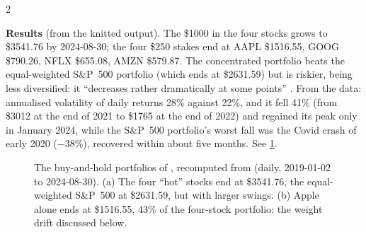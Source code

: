 \begin{paracol}{2}
\begin{casestudy}
\textbf{Results} (from the knitted output). The \$1000 in the four stocks grows to \$3541.76 by
2024-08-30; the four \$250 stakes end at AAPL \$1516.55, GOOG \$790.26, NFLX \$655.08, AMZN \$579.87.
The concentrated portfolio beats the equal-weighted S\&P~500 portfolio (which ends at \$2631.59) but is
riskier, being less diversified: it ``decreases rather dramatically at some points'' .
From the data: annualised volatility of daily returns 28\% against 22\%, and it fell 41\% (from \$3012 at the
end of 2021 to \$1765 at the end of 2022) and regained its peak only in January 2024, while the S\&P~500
portfolio's worst fall was the Covid crash of early 2020 ($-38\%$), recovered within about five months. See \cref{fig:ewport}.
\end{casestudy}

\begin{figure}[!htb]
\centering
{}
\hfill
{}
\caption{The buy-and-hold portfolios of , recomputed from
 (daily, 2019-01-02 to 2024-08-30). (a) The four ``hot'' stocks end at \$3541.76,
the equal-weighted S\&P~500 at \$2631.59, but with larger swings. (b) Apple alone ends at \$1516.55, 43\% of the
four-stock portfolio: the weight drift discussed below.}\label{fig:ewport}
\end{figure}


\end{paracol}
